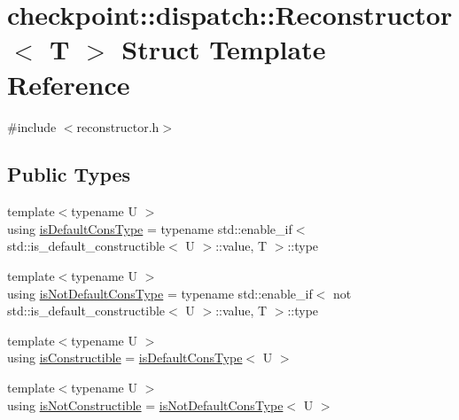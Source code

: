 \hypertarget{structcheckpoint_1_1dispatch_1_1_reconstructor}{}\section{checkpoint\+:\+:dispatch\+:\+:Reconstructor$<$ T $>$ Struct Template Reference}
\label{structcheckpoint_1_1dispatch_1_1_reconstructor}


{\ttfamily \#include $<$reconstructor.\+h$>$}

\subsection*{Public Types}
\begin{DoxyCompactItemize}
\item 
{\footnotesize template$<$typename U $>$ }\\using \hyperlink{structcheckpoint_1_1dispatch_1_1_reconstructor_ae91135a7a24b1008e7f184271fbc35d8}{is\+Default\+Cons\+Type} = typename std\+::enable\+\_\+if$<$ std\+::is\+\_\+default\+\_\+constructible$<$ U $>$\+::value, T $>$\+::type
\item 
{\footnotesize template$<$typename U $>$ }\\using \hyperlink{structcheckpoint_1_1dispatch_1_1_reconstructor_a0062e5edfdd87b34c3e5464d1f1020ec}{is\+Not\+Default\+Cons\+Type} = typename std\+::enable\+\_\+if$<$ not std\+::is\+\_\+default\+\_\+constructible$<$ U $>$\+::value, T $>$\+::type
\item 
{\footnotesize template$<$typename U $>$ }\\using \hyperlink{structcheckpoint_1_1dispatch_1_1_reconstructor_a580580febf5689aeffcc477d304aa469}{is\+Constructible} = \hyperlink{structcheckpoint_1_1dispatch_1_1_reconstructor_ae91135a7a24b1008e7f184271fbc35d8}{is\+Default\+Cons\+Type}$<$ U $>$
\item 
{\footnotesize template$<$typename U $>$ }\\using \hyperlink{structcheckpoint_1_1dispatch_1_1_reconstructor_a6220795c08856d2f0d86f1659647e2f0}{is\+Not\+Constructible} = \hyperlink{structcheckpoint_1_1dispatch_1_1_reconstructor_a0062e5edfdd87b34c3e5464d1f1020ec}{is\+Not\+Default\+Cons\+Type}$<$ U $>$
\end{DoxyCompactItemize}
